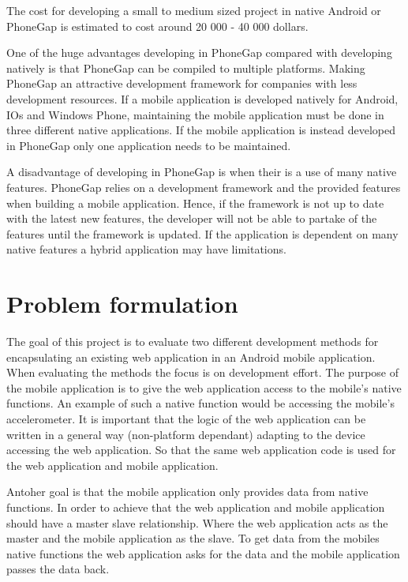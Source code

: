 The cost for developing a small to medium sized project in native Android or PhoneGap is estimated to cost around 20 000 - 40 000 dollars\cite{kohan2015}. 

One of the huge advantages developing in PhoneGap compared with developing natively is that PhoneGap can be compiled to multiple platforms. Making PhoneGap an attractive development framework for companies with less development resources. If a mobile application is developed natively for Android, IOs and Windows Phone, maintaining the mobile application must be done in three different native applications. If the mobile application is instead developed in PhoneGap only one application needs to be maintained. 

A disadvantage of developing in PhoneGap is when their is a use of many native features. PhoneGap relies on a development framework and the provided features when building a mobile application. Hence, if the framework is not up to date with the latest new features, the developer will not be able to partake of the features until the framework is updated. If the application is dependent on many native features a hybrid application may have limitations\cite{kohan2015}.   

\section{Problem formulation}
The goal of this project is to evaluate two different development methods for encapsulating an existing web application in an Android mobile application. When evaluating the methods the focus is on development effort. The purpose of the mobile application is to give the web application access to the mobile's native functions. An example of such a native function would be accessing the mobile's accelerometer. It is important that the logic of the web application can be written in a general way (non-platform dependant) adapting to the device accessing the web application. So that the same web application code is used for the web application and mobile application.

Antoher goal is that the mobile application only provides data from native functions. In order to achieve that the web application and mobile application should have a master slave relationship. Where the web application acts as the master and the mobile application as the slave. To get data from the mobiles native functions the web application asks for the data and the mobile application passes the data back.

